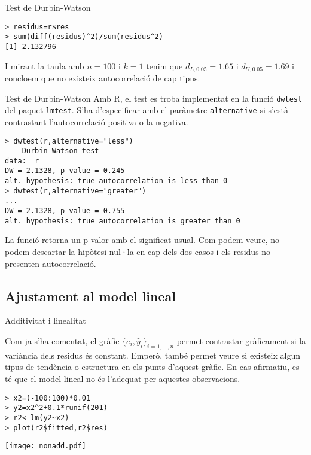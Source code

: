 \documentclass[12pt,t]{beamer}
\theoremstyle{plain}
\theoremstyle{definition}
\begin{document}
\begin{frame}[fragile]{Test de Durbin-Watson}
\begin{verbatim}
> residus=r$res
> sum(diff(residus)^2)/sum(residus^2)
[1] 2.132796
\end{verbatim}
I mirant la taula amb $n=100$ i $k=1$ tenim que $d_{L,0.05}=1.65$ i $d_{U,0.05}=1.69$ i concloem que no existeix autocorrelació de cap tipus.
\end{frame}

\begin{frame}[fragile]{Test de Durbin-Watson}
Amb R, el test es troba implementat en la funció \texttt{dwtest} del paquet \texttt{lmtest}. S'ha d'especificar amb el paràmetre \texttt{alternative} si s'està contrastant l'autocorrelació positiva o la negativa.
\begin{footnotesize}
\begin{verbatim}
> dwtest(r,alternative="less")
	Durbin-Watson test
data:  r
DW = 2.1328, p-value = 0.245
alt. hypothesis: true autocorrelation is less than 0
> dwtest(r,alternative="greater")
...
DW = 2.1328, p-value = 0.755
alt. hypothesis: true autocorrelation is greater than 0
\end{verbatim}
\end{footnotesize}
La funció retorna un p-valor amb el significat usual. Com podem veure, no podem descartar la hipòtesi nul·la en cap dels dos casos i els residus no presenten autocorrelació.
\end{frame}

\subsection{Ajustament al model lineal}
\begin{frame}[fragile]{Additivitat i linealitat}

Com ja s'ha comentat, el gràfic $\{e_i,\hat{y}_i\}_{i=1,\ldots,n}$ permet contrastar gràficament si la variància dels residus és constant. Emperò, també permet veure si existeix algun tipus de tendència o estructura en els punts d'aquest gràfic. En cas afirmatiu, es té que el model lineal no és l'adequat per aquestes observacions. 

\vspace{0.25cm}

\begin{minipage}[c]{0.4\linewidth}


\begin{footnotesize}

\begin{verbatim}
> x2=(-100:100)*0.01
> y2=x2^2+0.1*runif(201)
> r2<-lm(y2~x2)
> plot(r2$fitted,r2$res)
\end{verbatim}
\end{footnotesize}

\end{minipage}
\hfill
\begin{minipage}[c]{0.5\linewidth}

\texttt{[image: nonadd.pdf]}

\end{minipage}

\end{frame}
\end{document}
